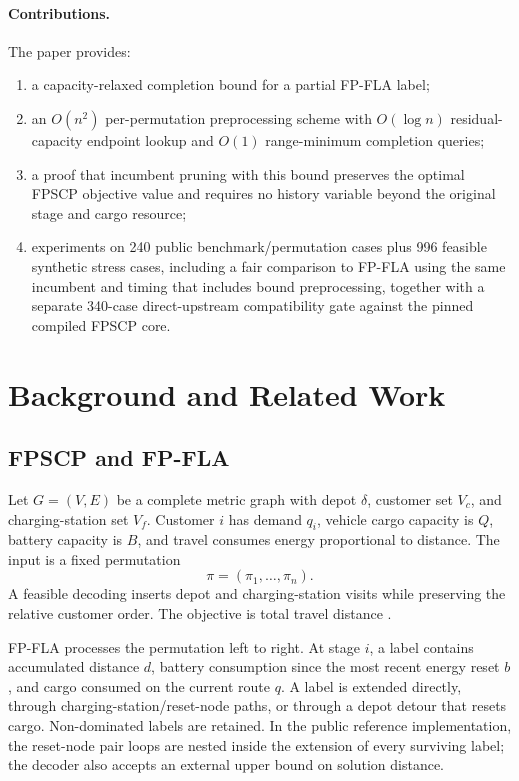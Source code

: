 \documentclass[11pt]{article}
\newcommand{\depot}{\delta}
\begin{document}
\paragraph{Contributions.} The paper provides:
\begin{enumerate}[leftmargin=*]
    \item a capacity-relaxed completion bound for a partial FP-FLA label;
    \item an $O(n^2)$ per-permutation preprocessing scheme with $O(\log n)$ residual-capacity endpoint lookup and $O(1)$ range-minimum completion queries;
    \item a proof that incumbent pruning with this bound preserves the optimal FPSCP objective value and requires no history variable beyond the original stage and cargo resource;
    \item experiments on 240 public benchmark/permutation cases plus 996 feasible synthetic stress cases, including a fair comparison to FP-FLA using the same incumbent and timing that includes bound preprocessing, together with a separate 340-case direct-upstream compatibility gate against the pinned compiled FPSCP core.
\end{enumerate}

\section{Background and Related Work}
\subsection{FPSCP and FP-FLA}
Let $G=(V,E)$ be a complete metric graph with depot $\depot$, customer set $V_c$, and charging-station set $V_f$. Customer $i$ has demand $q_i$, vehicle cargo capacity is $Q$, battery capacity is $B$, and travel consumes energy proportional to distance. The input is a fixed permutation
\[
\pi=(\pi_1,\ldots,\pi_n).
\]
A feasible decoding inserts depot and charging-station visits while preserving the relative customer order. The objective is total travel distance \cite{uroic2026}.

FP-FLA processes the permutation left to right. At stage $i$, a label contains accumulated distance $d$, battery consumption since the most recent energy reset $b$, and cargo consumed on the current route $q$. A label is extended directly, through charging-station/reset-node paths, or through a depot detour that resets cargo. Non-dominated labels are retained. In the public reference implementation, the reset-node pair loops are nested inside the extension of every surviving label; the decoder also accepts an external upper bound on solution distance.
\end{document}
